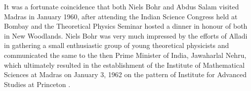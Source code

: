 \begin{figure}[H]
\end{figure}

It was a fortunate coincidence that both Niels Bohr and Abdus Salam visited Madras in January 1960, after attending the Indian Science Congress held at Bombay and the Theoretical Physics Seminar hosted a dinner in honour of both in New Woodlands. Niels Bohr was very much impressed by the efforts of Alladi in gathering a small enthusiastic group of young theoretical physicists and communicated the same to the then Prime Minister of India, Jawaharlal Nehru, which ultimately resulted in the establishment of the Institute of Mathematical Sciences at Madras 	on January 3, 1962 on the pattern of Institute for Advanced Studies at Princeton \cite{key9}.


